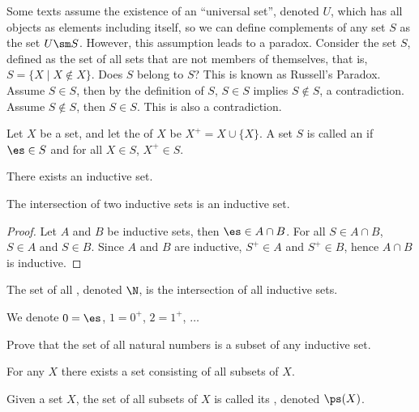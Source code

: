 \documentclass[10pt]{article}
\begin{document}
\par
Some texts assume the existence of an ``universal set'', denoted $U$, which has all objects as elements including itself, so we can define complements of any set $S$ as the set $U\sm S$. However, this assumption leads to a paradox. Consider the set $S$, defined as the set of all sets that are not members of themselves, that is, $S=\{X\mid X\notin X\}$. Does $S$ belong to $S$? This is known as Russell's Paradox. Assume $S\in S$, then by the definition of $S$, $S\in S$ implies $S\notin S$, a contradiction. Assume $S\notin S$, then $S\in S$. This is also a contradiction.
\begin{definition}
    Let $X$ be a set, and let the  of $X$ be ${X}^{+}=X\cup\{X\}$. A set $S$ is called an  if $\es\in S$ and for all $X\in S$, ${X}^{+}\in S$.
\end{definition}
\begin{Axiom of infinity}
    There exists an inductive set.
\end{Axiom of infinity}
\begin{proposition}
    The intersection of two inductive sets is an inductive set.
\end{proposition}
\begin{proof}
    Let $A$ and $B$ be inductive sets, then $\es\in A\cap B$. For all $S\in A\cap B$, $S\in A$ and $S\in B$. Since $A$ and $B$ are inductive, ${S}^{+}\in A$ and ${S}^{+}\in B$, hence $A\cap B$ is inductive.
\end{proof}
\par
\begin{definition}
    The set of all , denoted $\N$, is the intersection of all inductive sets. 
\end{definition}
\par
We denote $0=\es$, $1={0}^{+}$, $2={1}^{+}$, $\dots$
\begin{problem}
    Prove that the set of all natural numbers is a subset of any inductive set.
\end{problem}
\begin{Axiom of power set}
    For any $X$ there exists a set consisting of all subsets of $X$.
\end{Axiom of power set}
\begin{definition}
    Given a set $X$, the set of all subsets of $X$ is called its , denoted $\ps(X)$.
\end{definition}
\end{document}
